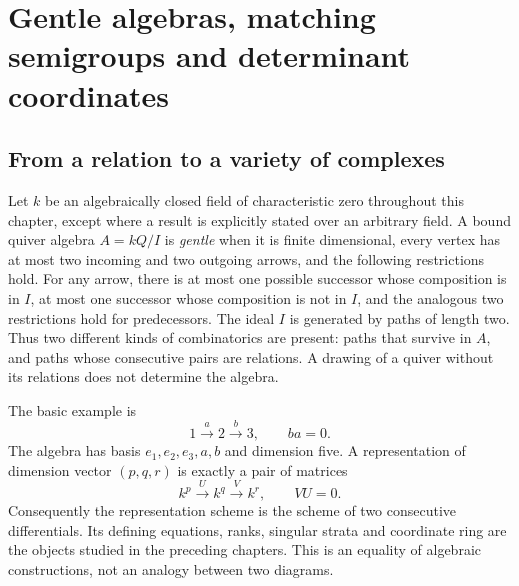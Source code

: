 \chapter{Gentle algebras, matching semigroups and determinant coordinates}
\label{ch:gentle-invariants}

\section{From a relation to a variety of complexes}
Let \(k\) be an algebraically closed field of characteristic zero throughout this chapter, except where a result is explicitly stated over an arbitrary field. A bound quiver algebra \(A=kQ/I\) is \emph{gentle} when it is finite dimensional, every vertex has at most two incoming and two outgoing arrows, and the following restrictions hold. For any arrow, there is at most one possible successor whose composition is in \(I\), at most one successor whose composition is not in \(I\), and the analogous two restrictions hold for predecessors. The ideal \(I\) is generated by paths of length two. Thus two different kinds of combinatorics are present: paths that survive in \(A\), and paths whose consecutive pairs are relations. A drawing of a quiver without its relations does not determine the algebra.

The basic example is
\[
 1\xrightarrow{a}2\xrightarrow{b}3,\qquad ba=0.
\]
The algebra has basis \(e_1,e_2,e_3,a,b\) and dimension five. A representation of dimension vector \((p,q,r)\) is exactly a pair of matrices
\[
 k^p\xrightarrow{U}k^q\xrightarrow{V}k^r,\qquad VU=0.
\]
Consequently the representation scheme is the scheme of two consecutive differentials. Its defining equations, ranks, singular strata and coordinate ring are the objects studied in the preceding chapters. This is an equality of algebraic constructions, not an analogy between two diagrams.

